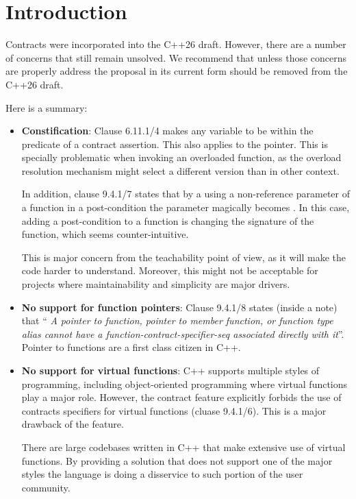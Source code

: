 \section{Introduction}

Contracts were incorporated into the C++26 draft. However, there are a number of
concerns that still remain unsolved. We recommend that unless those concerns are
properly address the proposal in its current form should be removed from the
C++26 draft.

Here is a summary:

\begin{itemize}

\item \textbf{Constification}: Clause 6.11.1/4 makes any variable to be
 within the predicate of a contract assertion. This also applies
to the  pointer. This is specially problematic when invoking an
overloaded function, as the overload resolution mechanism might select a
different version than in other context.

In addition, clause 9.4.1/7 states that by a using a non-reference parameter of
a function in a post-condition the parameter magically becomes .
In this case, adding a post-condition to a function is changing the signature of
the function, which seems counter-intuitive.

This is major concern from the teachability point of view, as it will make the
code harder to understand. Moreover, this might not be acceptable for projects
where maintainability and simplicity are major drivers.


\item \textbf{No support for function pointers}: Clause 9.4.1/8 states (inside a
note) that ``\emph{ A pointer to function, pointer to member function, or function
type alias cannot have a function-contract-specifier-seq associated directly
with it}''. Pointer to functions are a first class citizen in C++.

\item \textbf{No support for virtual functions}: C++ supports multiple styles of
programming, including object-oriented programming where virtual functions play
a major role. However, the contract feature explicitly forbids the use of
contracts specifiers for virtual functions (cluase 9.4.1/6). This is a major
drawback of the feature.

There are large codebases written in C++ that make extensive use of virtual
functions. By providing a solution that does not support one of the major styles
the language is doing a disservice to such portion of the user community.



\end{itemize}
